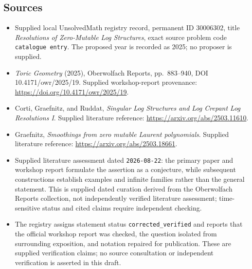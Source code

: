 \documentclass[11pt]{article}
\begin{document}
\subsection{Sources}
\begin{itemize}
\item Supplied local UnsolvedMath registry record, permanent ID \(30006302\), title \emph{Resolutions of Zero-Mutable Log Structures}, exact source problem code \texttt{catalogue entry}. The proposed year is recorded as 2025; no proposer is supplied.
\item \emph{Toric Geometry} (2025), Oberwolfach Reports, pp.\ 883--940, DOI 10.4171/owr/2025/19. Supplied workshop-report provenance: \url{https://doi.org/10.4171/owr/2025/19}.
\item Corti, Graefnitz, and Ruddat, \emph{Singular Log Structures and Log Crepant Log Resolutions I}. Supplied literature reference: \url{https://arxiv.org/abs/2503.11610}.
\item Graefnitz, \emph{Smoothings from zero mutable Laurent polynomials}. Supplied literature reference: \url{https://arxiv.org/abs/2503.18661}.
\item Supplied literature assessment dated \texttt{2026-08-22}: the primary paper and workshop report formulate the assertion as a conjecture, while subsequent constructions establish examples and infinite families rather than the general statement. This is supplied dated curation derived from the Oberwolfach Reports collection, not independently verified literature assessment; time-sensitive status and cited claims require independent checking.
\item The registry assigns statement status \texttt{corrected\_verified} and reports that the official workshop report was checked, the question isolated from surrounding exposition, and notation repaired for publication. These are supplied verification claims; no source consultation or independent verification is asserted in this draft.
\end{itemize}
\end{document}
